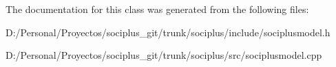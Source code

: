 The documentation for this class was generated from the following files\+:\begin{DoxyCompactItemize}
\item 
D\+:/\+Personal/\+Proyectos/sociplus\+\_\+git/trunk/sociplus/include/sociplusmodel.\+h\item 
D\+:/\+Personal/\+Proyectos/sociplus\+\_\+git/trunk/sociplus/src/sociplusmodel.\+cpp\end{DoxyCompactItemize}
